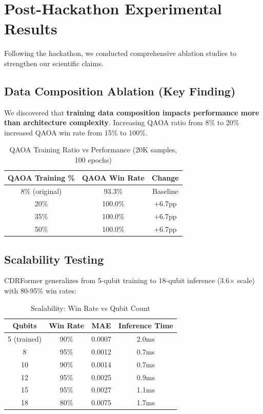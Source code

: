 \documentclass[11pt, a4paper]{article}
\begin{document}
\section{Post-Hackathon Experimental Results}

Following the hackathon, we conducted comprehensive ablation studies to strengthen our scientific claims.

\subsection{Data Composition Ablation (Key Finding)}

\begin{keyinsight}
We discovered that \textbf{training data composition impacts performance more than architecture complexity}. Increasing QAOA ratio from 8\% to 20\% increased QAOA win rate from 15\% to 100\%.
\end{keyinsight}

\begin{table}[H]
\centering
\caption{QAOA Training Ratio vs Performance (20K samples, 100 epochs)}
\begin{tabular}{@{}ccc@{}}
\toprule
\textbf{QAOA Training \%} & \textbf{QAOA Win Rate} & \textbf{Change} \\ \midrule
8\% (original) & 93.3\% & Baseline \\
20\% & 100.0\% & +6.7pp \\
35\% & 100.0\% & +6.7pp \\
50\% & 100.0\% & +6.7pp \\
\bottomrule
\end{tabular}
\end{table}

\subsection{Scalability Testing}

CDRFormer generalizes from 5-qubit training to 18-qubit inference (3.6$\times$ scale) with 80-95\% win rates:

\begin{table}[H]
\centering
\caption{Scalability: Win Rate vs Qubit Count}
\begin{tabular}{@{}cccc@{}}
\toprule
\textbf{Qubits} & \textbf{Win Rate} & \textbf{MAE} & \textbf{Inference Time} \\ \midrule
5 (trained) & 90\% & 0.0007 & 2.0ms \\
8 & 95\% & 0.0012 & 0.7ms \\
10 & 90\% & 0.0014 & 0.7ms \\
12 & 95\% & 0.0025 & 0.9ms \\
15 & 95\% & 0.0027 & 1.1ms \\
18 & 80\% & 0.0075 & 1.7ms \\
\bottomrule
\end{tabular}
\end{table}
\end{document}
